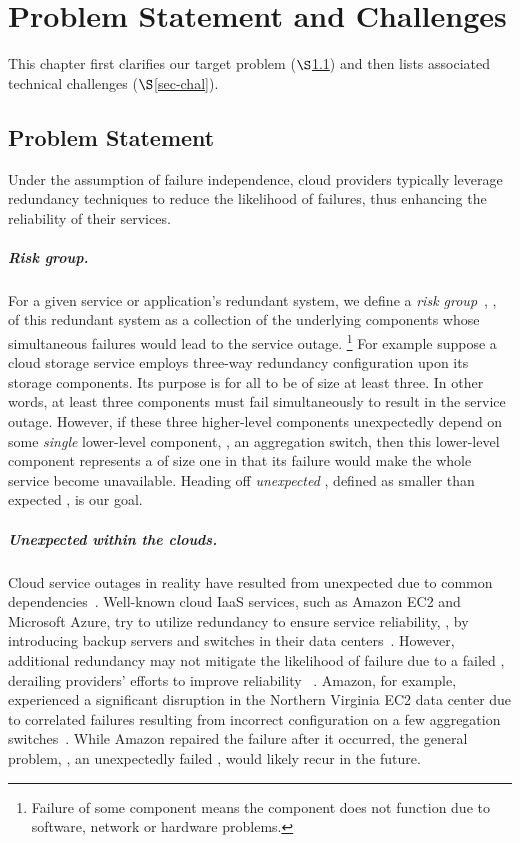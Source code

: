 \chapter{Problem Statement and Challenges}
\label{chap-prob}

This chapter first clarifies our target 
problem ($\S$\ref{sec-prob}) and then
lists associated technical challenges ($\S$\ref{sec-chal}).

\section{Problem Statement}
\label{sec-prob}

Under the assumption of failure independence,
cloud providers typically leverage redundancy techniques to
reduce the likelihood of failures,
thus enhancing the reliability of their services.

\paragraph{Risk group.}
For a given service or application's redundant system,
we define a {\em risk group}~\cite{kaminow97optical}, \rg, 
of this redundant system as a collection of the underlying components 
whose simultaneous failures would lead to the service outage.%
\footnote{Failure of some component means the component does not function
due to software, network or hardware problems.}
For example suppose a cloud storage service employs
three-way redundancy configuration upon its storage components.
Its purpose is for all \rgs to be of size at least three.
In other words, at least three components must fail simultaneously 
to result in the service outage.
However, if these three higher-level components unexpectedly 
depend on some {\em single} lower-level component,
\eg, an aggregation switch, then this lower-level component
represents a \rg of size one in that its failure
would make the whole service become unavailable.
Heading off {\em unexpected \rgs}, defined as
smaller than expected \rgs, is our goal.

\paragraph{Unexpected \rgs within the clouds.}
Cloud service outages in reality have resulted from
unexpected \rgs due to common dependencies~\cite{potharaju13network}.
Well-known cloud IaaS services, 
such as Amazon EC2 and Microsoft Azure, 
try to utilize redundancy to ensure
service reliability, \eg, by introducing backup 
servers and switches in their data centers~\cite{abu-libdeh10symbiotic, 
chuanxiong08dcell, mysore09portland, 
zhong08replication}.
However, additional redundancy may not mitigate 
the likelihood of failure due to a failed \rgs,
derailing providers' efforts to improve reliability%
~\cite{he13next}.
Amazon, for example, experienced a significant
disruption in the Northern Virginia EC2 data center
due to correlated failures resulting from 
incorrect configuration on a few 
aggregation switches~\cite{EC2Crash11}.
While Amazon repaired the failure after it occurred,
the general problem, \ie, an unexpectedly failed \rg, 
would likely recur in the future.


